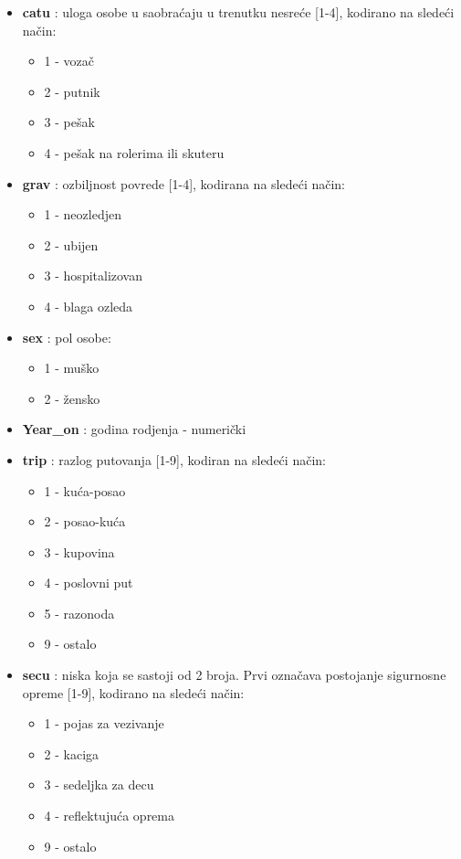 \documentclass[a4paper,10pt]{article}
\begin{document}
\begin{itemize}
\begin{itemize}
  \item \textbf{catu} : uloga osobe u saobraćaju u trenutku nesreće [1-4], kodirano na sledeći način:
	\begin{itemize}
	 \item 1 - vozač
	 \item 2 - putnik
	 \item 3 - pešak
	 \item 4 - pešak na rolerima ili skuteru
	\end{itemize}
  \item \textbf{grav} : ozbiljnost povrede [1-4], kodirana na sledeći način:
	\begin{itemize}
	 \item 1 - neozledjen
	 \item 2 - ubijen
	 \item 3 - hospitalizovan
	 \item 4 - blaga ozleda
	\end{itemize}
  \item \textbf{sex} : pol osobe:
	\begin{itemize}
	 \item 1 - muško
	 \item 2 - žensko
	\end{itemize}
  \item \textbf{Year\_on} : godina rodjenja - numerički
  \item \textbf{trip} : razlog putovanja [1-9], kodiran na sledeći način:
	\begin{itemize}
	 \item 1 - kuća-posao
	 \item 2 - posao-kuća
	 \item 3 - kupovina
	 \item 4 - poslovni put
	 \item 5 - razonoda
	 \item 9 - ostalo
	\end{itemize}
  \item \textbf{secu} : niska koja se sastoji od 2 broja. 
			Prvi označava postojanje sigurnosne opreme [1-9], kodirano na sledeći način:
	\begin{itemize}
	 \item 1 - pojas za vezivanje
	 \item 2 - kaciga
	 \item 3 - sedeljka za decu
	 \item 4 - reflektujuća oprema
	 \item 9 - ostalo
	\end{itemize}
	

\end{itemize}
\end{itemize}
\end{document}
